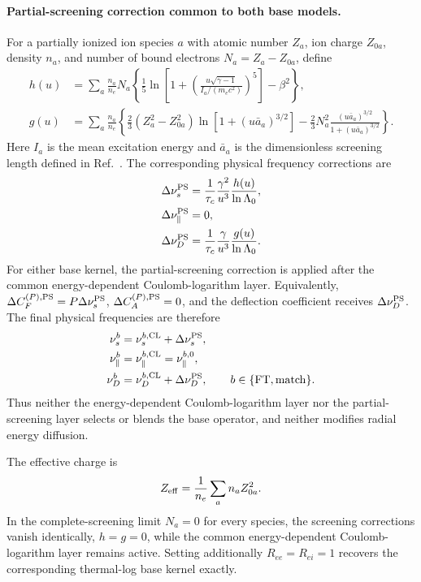 \documentclass[11pt]{article}
\begin{document}
\paragraph{Partial-screening correction common to both base models.}
For a partially ionized ion species $a$ with atomic number $Z_a$, ion charge
$Z_{0a}$, density $n_a$, and number of bound electrons $N_a=Z_a-Z_{0a}$, define
\cite{Hesslow2017Screening,Hesslow2018Collision}
\begin{align}
 h(u)
 &=\sum_a\frac{n_a}{n_e}N_a
 \left\{
  \frac15\ln\left[
   1+\left(\frac{u\sqrt{\gamma-1}}{I_a/(m_ec^2)}\right)^5
  \right]-\beta^2
 \right\},
 \label{eq:physical_h}\\
 g(u)
 &=\sum_a\frac{n_a}{n_e}
 \left\{
  \frac23(Z_a^2-Z_{0a}^2)
       \ln\left[1+(u\bar a_a)^{3/2}\right]
  -\frac23N_a^2
       \frac{(u\bar a_a)^{3/2}}{1+(u\bar a_a)^{3/2}}
 \right\}.
 \label{eq:physical_g}
\end{align}
Here $I_a$ is the mean excitation energy and $\bar a_a$ is the dimensionless screening
length defined in Ref.~\cite{Hesslow2018Collision}.  The corresponding physical
frequency corrections are
\begin{align}
 \Delta\nu_s^{\rm PS}
 &=\frac{1}{\tau_c}\frac{\gamma^2}{u^3}
   \frac{h(u)}{\ln\Lambda_0},\\
 \Delta\nu_\parallel^{\rm PS}&=0,\\
 \Delta\nu_D^{\rm PS}
 &=\frac{1}{\tau_c}\frac{\gamma}{u^3}
   \frac{g(u)}{\ln\Lambda_0}.
 \label{eq:physical_partial_screening_overlay}
\end{align}
For either base kernel, the partial-screening correction is applied after the common
energy-dependent Coulomb-logarithm layer.  Equivalently,
$\Delta C_F^{(P),\rm PS}=P\Delta\nu_s^{\rm PS}$,
$\Delta C_A^{(P),\rm PS}=0$, and the deflection coefficient receives
$\Delta\nu_D^{\rm PS}$.  The final physical frequencies are therefore
\begin{align}
 \nu_s^b&=\nu_s^{b,\rm CL}+\Delta\nu_s^{\rm PS},\\
 \nu_\parallel^b&=\nu_\parallel^{b,\rm CL}=\nu_\parallel^{b,0},\\
 \nu_D^b&=\nu_D^{b,\rm CL}+\Delta\nu_D^{\rm PS},
 \qquad b\in\{\mathrm{FT},\mathrm{match}\}.
 \label{eq:physical_final_collision_layers}
\end{align}
Thus neither the energy-dependent Coulomb-logarithm layer nor the partial-screening layer
selects or blends the base operator, and neither modifies radial energy diffusion.

The effective charge is
\begin{equation}
 Z_{\rm eff}=\frac{1}{n_e}\sum_a n_a Z_{0a}^2.
\end{equation}
In the complete-screening limit $N_a=0$ for every species, the screening corrections
vanish identically, $h=g=0$, while the common energy-dependent Coulomb-logarithm layer
remains active.  Setting additionally $R_{ee}=R_{ei}=1$ recovers the corresponding
thermal-log base kernel exactly.
\end{document}
